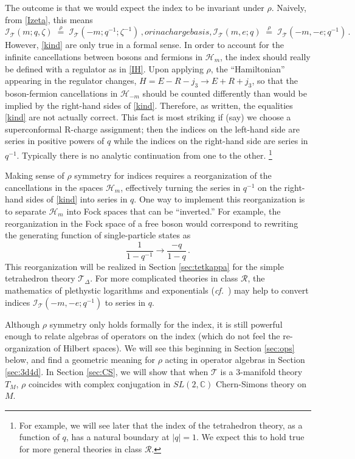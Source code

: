 \documentclass[11pt,letterpaper]{article}
\numberwithin{equation}{section}
\newcommand{\be}{\begin{equation}}
\newcommand{\ee}{\end{equation}}
\newcommand{\cf}{\emph{cf.}}
\newcommand{\C}{{\mathbb C}}
\newcommand{\CH}{\mathcal{H}}
\newcommand{\CI}{\mathcal{I}}
\newcommand{\CR}{\mathcal{R}}
\newcommand{\CT}{\mathcal{T}}
\begin{document}
The outcome is that we would expect the index to be invariant under $\rho$. Naively, from \eqref{Izeta}, this means
%
\begin{subequations} \label{kind}
\be \label{kzeta}
\CI_\CT(m;q,\zeta) \;\overset{\rho}{=}\; \CI_\CT(-m;q^{-1};\zeta^{-1})\,, \ee
%
or in a charge basis,
%
\be \label{kme}
\CI_\CT(m,e;q) \;\overset{\rho}{=}\; \CI_\CT(-m,-e;q^{-1})\,.\ee
\end{subequations}
%
However, \eqref{kind} are only true in a formal sense. In order to account for the infinite cancellations between bosons and fermions in $\CH_m$, the index should really be defined with a regulator as in \eqref{IH}. Upon applying $\rho$, the ``Hamiltonian'' appearing in the regulator changes, $H = E-R-j_3\to E+R+j_3$, so that the boson-fermion cancellations in $\CH_{-m}$ should be counted differently than would be implied by the right-hand sides of \eqref{kind}. Therefore, as written, the equalities \eqref{kind} are not actually correct. This fact is most striking if (say) we choose a superconformal R-charge assignment; then the indices on the left-hand side are series in positive powers of $q$ while the indices on the right-hand side are series in $q^{-1}$. Typically there is no analytic continuation from one to the other.%
%
\footnote{For example, we will see later that the index of the tetrahedron theory, as a function of $q$, has a natural boundary at $|q|=1$. We expect this to hold true for more general theories in class $\CR$.}


Making sense of $\rho$ symmetry for indices requires a reorganization of the cancellations in the spaces $\CH_m$, effectively turning the series in $q^{-1}$ on the right-hand sides of \eqref{kind} into series in $q$. One way to implement this reorganization is to separate $\CH_m$ into Fock spaces that can be ``inverted.'' For example, the reorganization in the Fock space of a free boson would correspond to rewriting the generating function of single-particle states as
%
\be \frac{1}{1-q^{-1}} \to \frac{-q}{1-q}\,.\ee
%
This reorganization will be realized in Section \ref{sec:tetkappa} for the simple tetrahedron theory $\CT_\Delta$. For more complicated theories in class $\CR$, the mathematics of plethystic logarithms and exponentials (\cf\ \cite{Hanany-pleth}) may help to convert indices $\CI_\CT(-m,-e;q^{-1})$ to series in $q$.

Although $\rho$ symmetry only holds formally for the index, it is still powerful enough to relate algebras of operators on the index (which do not feel the re-organization of Hilbert spaces). We will see this beginning in Section \ref{sec:ops} below, and find a geometric meaning for $\rho$ acting in operator algebras in Section \ref{sec:3d4d}. In Section \ref{sec:CS}, we will show that when $\CT$ is a 3-manifold theory $T_M$, $\rho$ coincides with complex conjugation in $SL(2,\C)$ Chern-Simons theory on $M$.
\end{document}

